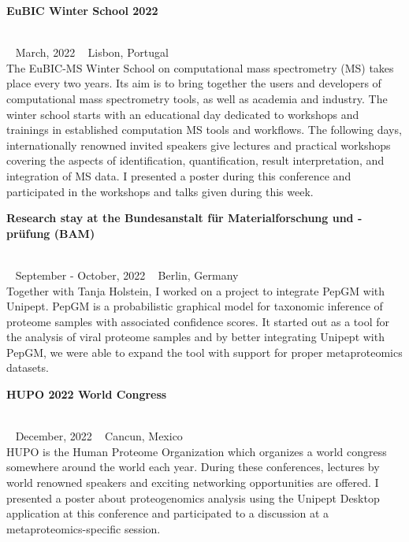 \begin{large}\textbf{\textsf{EuBIC Winter School 2022}}\end{large} \\
\faCalendar ~ \textsf{March, 2022} \hfill \faGlobe ~ \textsf{Lisbon, Portugal} \\
The EuBIC-MS Winter School on computational mass spectrometry (MS) takes place every two years.
Its aim is to bring together the users and developers of computational mass spectrometry tools, as well as academia and industry.
The winter school starts with an educational day dedicated to workshops and trainings in established computation MS tools and workflows.
The following days, internationally renowned invited speakers give lectures and practical workshops covering the aspects of identification, quantification, result interpretation, and integration of MS data.
I presented a poster during this conference and participated in the workshops and talks given during this week.

\begin{large}\textbf{\textsf{Research stay at the Bundesanstalt für Materialforschung und -prüfung (BAM)}}\end{large} \\
\faCalendar ~ \textsf{September - October, 2022} \hfill \faGlobe ~ \textsf{Berlin, Germany} \\
Together with Tanja Holstein, I worked on a project to integrate PepGM with Unipept.
PepGM is a probabilistic graphical model for taxonomic inference of proteome samples with associated confidence scores.
It started out as a tool for the analysis of viral proteome samples and by better integrating Unipept with PepGM, we were able to expand the tool with support for proper metaproteomics datasets.

\pagebreak

\begin{large}\textbf{\textsf{HUPO 2022 World Congress}}\end{large} \\
\faCalendar ~ \textsf{December, 2022} \hfill \faGlobe ~ \textsf{Cancun, Mexico} \\
HUPO is the Human Proteome Organization which organizes a world congress somewhere around the world each year.
During these conferences, lectures by world renowned speakers and exciting networking opportunities are offered.
I presented a poster about proteogenomics analysis using the Unipept Desktop application at this conference and participated to a discussion at a metaproteomics-specific session.

